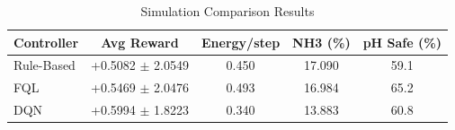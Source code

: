 \begin{table}[h]
\centering
\caption{Simulation Comparison Results}
\label{tab:sim}
\begin{tabular}{lcccc}
\hline
Controller & Avg Reward & Energy/step & NH3 (\%) & pH Safe (\%) \\
\hline
Rule-Based & +0.5082 $\pm$ 2.0549 & 0.450 & 17.090 & 59.1 \\
FQL & +0.5469 $\pm$ 2.0476 & 0.493 & 16.984 & 65.2 \\
DQN & +0.5994 $\pm$ 1.8223 & 0.340 & 13.883 & 60.8 \\
\hline
\end{tabular}
\end{table}
